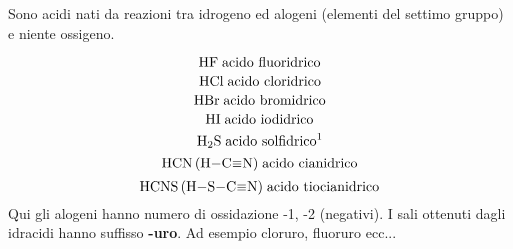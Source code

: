 Sono acidi nati da reazioni tra idrogeno ed alogeni (elementi del settimo gruppo) e niente ossigeno.

$$\ce{HF} \; \text{acido fluoridrico}$$
$$\ce{HCl} \; \text{acido cloridrico}$$
$$\ce{HBr} \; \text{acido bromidrico}$$
$$\ce{HI} \; \text{acido iodidrico}$$
$$\ce{H_2S} \; \text{acido solfidrico\footnotemark}$$
$$\ce{HCN (H-C#N)} \; \text{acido cianidrico}$$
$$\ce{HCNS (H-S-C#N)} \; \text{acido tiocianidrico}$$
Qui gli alogeni hanno numero di ossidazione -1, -2 (negativi). I sali ottenuti dagli idracidi hanno suffisso \textbf{-uro}. Ad esempio cloruro, fluoruro ecc...

